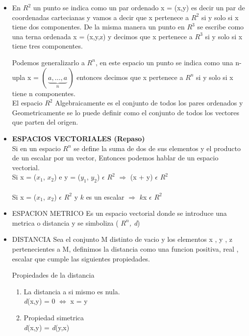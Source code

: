 \documentclass[a4paper,12pt]{article}
\begin{document}
\begin{itemize}
    \item En $R^{2}$ un punto se indica como un par ordenado x = (x,y) es decir	un par de coordenadas cartecianas y vamos a decir que x pertenece a $R^{2}$ si y solo si x  tiene dos componentes.
		De la misma manera un punto en $R^{3}$ se escribe como una terna ordenada x = (x,y,z) y 				decimos que x pertenece a $R^{3}$ si y solo si x tiene tres componentes.
		
		Podemos generalizarlo a $R^{n}$, en este espacio un punto se indica como una n-upla 
		x = $(\,\underbrace{a,\ldots, a}_{n}\,)$ entonces decimos que x pertenece a $R^{n}$ si y solo si x tiene n componentes.
\\		El espacio $R^{2}$ Algebraicamente es el conjunto de todos los pares ordenados y 						Geometricamente se lo puede definir como el conjunto de todos los vectores que parten 		del origen.

    \item \textbf{ESPACIOS VECTORIALES (Repaso)}
\\   Si en un espacio $R^{n}$ se define la suma de dos de sus elementos y el producto de un escalar por un vector, Entonces podemos hablar de un espacio vectorial.
\\   Si x = ($x_{1}$, $x_{2}$) e y = ($y_{1}$, $y_{2}$) $\epsilon$ $R^{2}$ $\Rightarrow$ (x + y) $\epsilon$ $R^{2}$ 
\\
\\
 Si x = ($x_{1}$, $x_{2}$) $\epsilon$ $R^{2}$ y $k$ es un escalar  $\Rightarrow$ $k$x  $\epsilon$ $R^{2}$ 

    \item ESPACION METRICO
Es un espacio vectorial donde se introduce una metrica o distancia y se simboliza  (\textit{ $R^{n}$, d})

    \item DISTANCIA
Sea el conjunto M distinto de vacio y  los elementos  x , y , z  pertenecientes a M, definimos la distancia como una funcion positiva, real , escalar que cumple las siguientes propiedades.

Propiedades de la distancia
\begin{enumerate}
\item La distancia a si mismo es nula.
\\ \textit d({x,y}) = 0 $\Longleftrightarrow$  x = y

\item Propiedad simetrica
\\ \textit d({x,y}) = \textit d({y,x})



\end{enumerate}
\end{itemize}
\end{document}
